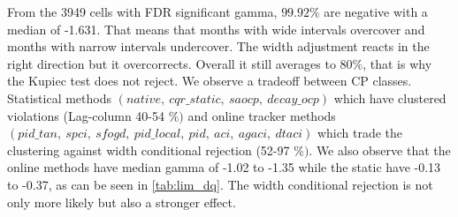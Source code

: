 %
From the 3949 cells with FDR significant gamma, $99.92\%$ are negative with a median of -1.631. That means that months with wide intervals overcover and months with narrow intervals undercover. The width adjustment reacts in the right direction but it overcorrects. Overall it still averages to $80\%$, that is why the Kupiec test does not reject. 
%
We observe a tradeoff between CP classes. Statistical methods $(native,\ cqr\_static,\ saocp,\ decay\_ocp)$ which have clustered violations (Lag-column 40-54 $\%)$ and online tracker methods $(pid\_tan,\ spci,\ sfogd,\ pid\_local,\ pid, \ aci,\ agaci,\ dtaci)$ which trade the clustering against width conditional rejection (52-97 $\%)$. We also observe that the online methods have median gamma of -1.02 to -1.35 while the static have -0.13 to -0.37, as can be seen in \cref{tab:lim_dq}. The width conditional rejection is not only more likely but also a stronger effect. 
